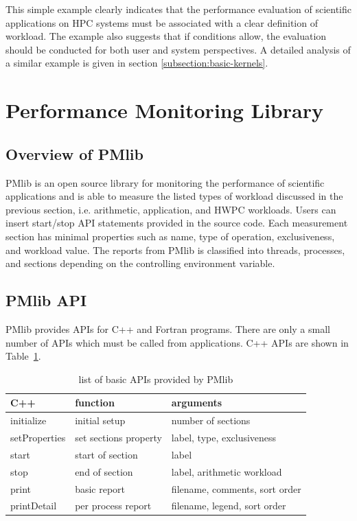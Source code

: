 \documentclass[conference]{IEEEtran}
\begin{document}
This simple example clearly indicates that the performance evaluation of
scientific applications on HPC systems must be associated with a clear
definition of workload. The example also suggests that if conditions allow,
the evaluation should be
conducted for both user and system perspectives.
A detailed analysis of a similar example is given in section
\ref{subsection:basic-kernels}.

\section{Performance Monitoring Library}
\label{section:PMlib}

%
\subsection {Overview of PMlib}
PMlib is an open source library for monitoring the performance of scientific
applications and is able to measure the listed types of workload discussed
in the previous section, i.e. arithmetic, application, and HWPC workloads.
Users can insert start/stop API statements provided in the source code.
Each measurement section has minimal properties such as name, type of operation,
exclusiveness, and workload value.
The reports from PMlib is classified into threads, processes, and sections
depending on the controlling environment variable.

%
\subsection{PMlib API}
PMlib provides APIs for C++ and Fortran programs.
There are only a small number of APIs which must be called from applications.
C++ APIs are shown in Table~\ref{tab:PMlib-API}. 

\begin{table}[tb]
\footnotesize
\caption{list of basic APIs provided by PMlib}
\label{tab:PMlib-API}
\begin{tabular}{l|l|l} \hline
C++	& function	&	arguments	\\ \hline \hline
initialize	& initial setup	& number of sections \\ %
setProperties	& set sections property	& label, type, exclusiveness \\ %
start	& start of section	& label \\ %
stop	& end of section	& label, arithmetic workload \\ %
print	& basic report	& filename, comments, sort order	\\ %
printDetail	& per process report	& filename, legend, sort order	\\ %
\end{tabular}
\end{table}
\end{document}
